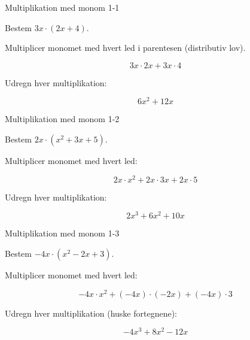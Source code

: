 \documentclass{article}
\begin{document}

\tableofcontents
\newpage

\begin{exercise}{Multiplikation med monom 1-1}

Bestem $3x \cdot (2x + 4)$.


\hint

Multiplicer monomet med hvert led i parentesen (distributiv lov).

\hint
\[
3x \cdot 2x + 3x \cdot 4
\]

\hint

Udregn hver multiplikation:

\hint
\[
6x^2 + 12x
\]

\end{exercise}

\newpage

\begin{exercise}{Multiplikation med monom 1-2}

Bestem $2x \cdot (x^2 + 3x + 5)$.


\hint

Multiplicer monomet med hvert led:

\hint
\[
2x \cdot x^2 + 2x \cdot 3x + 2x \cdot 5
\]

\hint

Udregn hver multiplikation:

\hint
\[
2x^3 + 6x^2 + 10x
\]

\end{exercise}

\newpage

\begin{exercise}{Multiplikation med monom 1-3}

Bestem $-4x \cdot (x^2 - 2x + 3)$.


\hint

Multiplicer monomet med hvert led:

\hint
\[
-4x \cdot x^2 + (-4x) \cdot (-2x) + (-4x) \cdot 3
\]

\hint

Udregn hver multiplikation (huske fortegnene):

\hint
\[
-4x^3 + 8x^2 - 12x
\]

\end{exercise}
\end{document}
